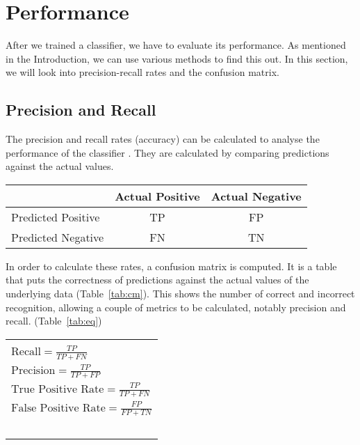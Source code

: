 \section{Performance}
After we trained a classifier, we have to evaluate its performance. As mentioned in the Introduction, we can use various methods to find this out. In this section, we will look into precision-recall rates and the confusion matrix. 

\subsection{Precision and Recall}
The precision and recall rates (accuracy) can be calculated to analyse the performance of the classifier \cite{precision-recall}. They are calculated by comparing predictions against the actual values.

\parbox{\linewidth} {
  \centering
  \begin{tabular}{|l|c|c|}
    \hline
                        & Actual Positive & Actual Negative
    \\ \hline
    Predicted Positive  & TP              & FP
    \\ \hline
    Predicted Negative  & FN              & TN
    \\ \hline
  \end{tabular}

  \label{tab:cm}
}

In order to calculate these rates, a confusion matrix is computed. It is a table that puts the correctness of predictions against the actual values of the underlying data (Table~\ref{tab:cm}). This shows the number of correct and incorrect recognition, allowing a couple of metrics to be calculated, notably precision and recall. (Table~\ref{tab:eq}) 

\parbox{\linewidth} {
  \centering
  \begin{tabular}{|l|}
    \hline \\
    \( \text{Recall}              = \frac{TP}{TP + FN} \) \\[10pt]
    \( \text{Precision}           = \frac{TP}{TP + FP} \) \\[10pt]
    \( \text{True Positive Rate}  = \frac{TP}{TP + FN} \) \\[10pt]
    \( \text{False Positive Rate} = \frac{FP}{FP + TN} \) \\~\\
    \hline
  \end{tabular}
  
  \label{tab:eq}
}

